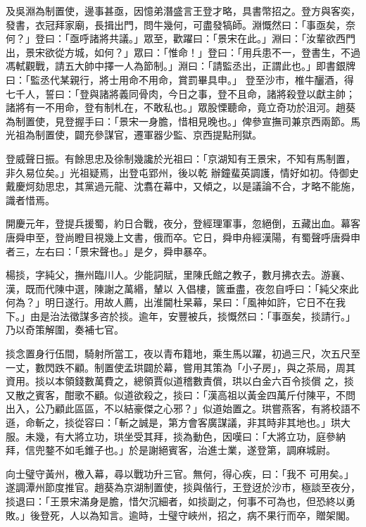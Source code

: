 \begin{pinyinscope}
 及吳淵為制置使，邊事甚亟，因憶弟潛盛言王登才略，具書幣招之。登方與客奕，發書，衣冠拜家廟，長揖出門，問牛幾何，可盡發犒師。淵慨然曰：「事亟矣，奈何？」登曰：「亟呼諸將共議。」眾至，歡躍曰：「景宋在此。」淵曰：「汝輩欲西門出，景宋欲從方城，如何？」眾曰：「惟命！」登曰：「用兵患不一，登書生，不過馮軾觀戰，請五大帥中擇一人為節制。」淵曰：「請監丞出，正謂此也。」即書銀牌曰：「監丞代某親行，將士用命不用命，賞罰畢具申。」
 登至沙市，椎牛釃酒，得七千人，誓曰：「登與諸將義同骨肉，今日之事，登不且命，諸將殺登以獻主帥；諸將有一不用命，登有制札在，不敢私也。」眾股慄聽命，竟立奇功於沮河。趙葵為制置使，見登握手曰：「景宋一身膽，惜相見晚也。」俾參宣撫司兼京西兩節。馬光祖為制置使，闢充參謀官，遷軍器少監、京西提點刑獄。



 登威聲日振。有餘思忠及徐制幾讒於光祖曰：「京湖知有王景宋，不知有馬制置，非久易位矣。」光祖疑焉，出登屯郢州，後以乾
 辦鐘蜚英調護，情好如初。侍御史戴慶炣劾思忠，其黨過元龍、沈翥在幕中，又傾之，以是議論不合，才略不能施，識者惜焉。



 開慶元年，登提兵援蜀，約日合戰，夜分，登經理軍事，忽絕倒，五藏出血。幕客唐舜申至，登尚瞪目視幾上文書，俄而卒。它日，舜申舟經漢陽，有蜀聲呼唐舜申者三，左右曰：「景宋聲也。」是夕，舜申暴卒。



 楊掞，字純父，撫州臨川人。少能詞賦，里陳氏館之教子，數月拂衣去。游襄、漢，既而代陳中選，陳謝之萬緡，輦以
 入倡樓，篋垂盡，夜忽自呼曰：「純父來此何為？」明日遂行。用故人薦，出淮閫杜杲幕，杲曰：「風神如許，它日不在我下。」由是治法徵謀多咨於掞。逾年，安豐被兵，掞慨然曰：「事亟矣，掞請行。」乃以奇策解圍，奏補七官。



 掞念置身行伍間，騎射所當工，夜以青布籍地，乘生馬以躍，初過三尺，次五尺至一丈，數閃跌不顧。制置使孟珙闢於幕，嘗用其策為「小子房」，與之茶局，周其資用。掞以本領錢數萬費之，總領賈似道稽數責償，珙以白金六百令掞償
 之，掞又散之賓客，酣歌不顧。似道欲殺之，掞曰：「漢高祖以黃金四萬斤付陳平，不問出入，公乃顧此區區，不以結豪傑之心邪？」似道始置之。珙嘗燕客，有將校語不遜，命斬之，掞從容曰：「斬之誠是，第方會客廣謀議，非其時非其地也。」珙大服。未幾，有大將立功，珙坐受其拜，掞為動色，因嘆曰：「大將立功，庭參納拜，信兜鍪不如毛錐子也。」於是謝絕賓客，治進士業，遂登第，調麻城尉。



 向士璧守黃州，檄入幕，尋以戰功升三官。無何，得心疾，曰：「我不
 可用矣。」遂調潭州節度推官。趙葵為京湖制置使，掞與偕行，王登迓於沙市，極談至夜分，掞退曰：「王景宋滿身是膽，惜欠沉細者，如掞副之，何事不可為也，但恐終以勇敗。」後登死，人以為知言。逾時，士璧守峽州，招之，病不果行而卒，贈架閣。




\end{pinyinscope}

